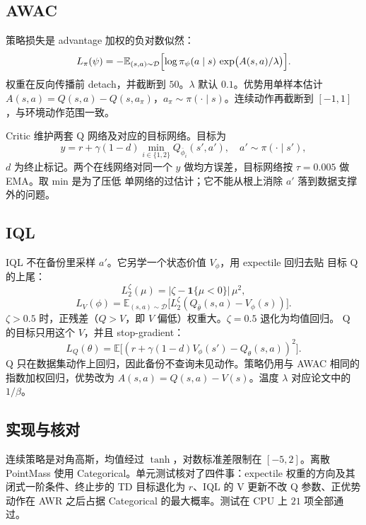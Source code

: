 \documentclass[10pt,twocolumn,a4paper]{ctexart}
\begin{document}
\subsection{AWAC}
策略损失是 advantage 加权的负对数似然\citep{peng2019awr,nair2020awac}：
\begin{equation}
L_\pi(\psi)=-\mathbb{E}_{(s,a)\sim\mathcal{D}}
\Bigl[\log\pi_\psi(a\mid s)\,
\exp\bigl(A(s,a)/\lambda\bigr)\Bigr].
\end{equation}
权重在反向传播前 detach，并截断到 $50$。$\lambda$ 默认 $0.1$。优势用单样本估计
$A(s,a)=Q(s,a)-Q(s,a_{\pi})$，$a_{\pi}\sim\pi(\cdot\mid s)$。连续动作再截断到
$[-1,1]$，与环境动作范围一致。

Critic 维护两套 Q 网络及对应的目标网络。目标为
\begin{equation}
y=r+\gamma(1-d)\min_{i\in\{1,2\}}Q_{\bar\phi_i}(s',a'),
\quad a'\sim\pi(\cdot\mid s'),
\end{equation}
$d$ 为终止标记。两个在线网络对同一个 $y$ 做均方误差，目标网络按
$\tau=0.005$ 做 EMA\citep{fujimoto2018td3,lillicrap2016ddpg}。取 min 是为了压低
单网络的过估计；它不能从根上消除 $a'$ 落到数据支撑外的问题。

\subsection{IQL}
IQL 不在备份里采样 $a'$。它另学一个状态价值 $V_\phi$，用 expectile 回归去贴
目标 Q 的上尾\citep{newey1987expectile,kostrikov2022iql}：
\begin{equation}
L_2^{\zeta}(\mu)=\lvert\zeta-\mathbf{1}\{\mu<0\}\rvert\,\mu^{2},
\end{equation}
\begin{equation}
L_V(\phi)=\mathbb{E}_{(s,a)\sim\mathcal{D}}
\bigl[L_2^{\zeta}(Q_{\bar\theta}(s,a)-V_\phi(s))\bigr].
\end{equation}
$\zeta>0.5$ 时，正残差（$Q>V$，即 $V$ 偏低）权重大。$\zeta=0.5$ 退化为均值回归。
Q 的目标只用这个 $V$，并且 stop-gradient：
\begin{equation}
L_Q(\theta)=\mathbb{E}\bigl[(r+\gamma(1-d)V_\phi(s')-Q_\theta(s,a))^{2}\bigr].
\end{equation}
Q 只在数据集动作上回归，因此备份不查询未见动作。策略仍用与 AWAC 相同的
指数加权回归，优势改为 $A(s,a)=Q(s,a)-V(s)$。温度 $\lambda$ 对应论文中的
$1/\beta$。

\subsection{实现与核对}
连续策略是对角高斯，均值经过 $\tanh$，对数标准差限制在 $[-5,2]$。离散
PointMass 使用 Categorical。单元测试核对了四件事：expectile 权重的方向及其
闭式一阶条件、终止步的 TD 目标退化为 $r$、IQL 的 V 更新不改 Q 参数、正优势
动作在 AWR 之后占据 Categorical 的最大概率。测试在 CPU 上 $21$ 项全部通过。
\end{document}
